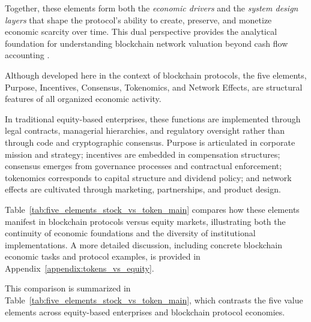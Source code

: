 \documentclass[12pt]{article}
\begin{document}
Together, these elements form both the \textit{economic drivers} and the \textit{system design layers} that shape the protocol’s ability to create, preserve, and monetize economic scarcity over time. This dual perspective provides the analytical foundation for understanding blockchain network valuation beyond cash flow accounting \citep{papadogiannis2025scarcity, papadogiannis2025dualrisk}.

\begin{tcolorbox}[title=\textbf{Universality of the Five Elements}]
Although developed here in the context of blockchain protocols, the five elements, Purpose, Incentives, Consensus, Tokenomics, and Network Effects, are structural features of all organized economic activity. 

In traditional equity-based enterprises, these functions are implemented through legal contracts, managerial hierarchies, and regulatory oversight rather than through code and cryptographic consensus. Purpose is articulated in corporate mission and strategy; incentives are embedded in compensation structures; consensus emerges from governance processes and contractual enforcement; tokenomics corresponds to capital structure and dividend policy; and network effects are cultivated through marketing, partnerships, and product design.

Table~\ref{tab:five_elements_stock_vs_token_main} compares how these elements manifest in blockchain protocols versus equity markets, illustrating both the continuity of economic foundations and the diversity of institutional implementations. A more detailed discussion, including concrete blockchain economic tasks and protocol examples, is provided in Appendix~\ref{appendix:tokens_vs_equity}.
\end{tcolorbox}

This comparison is summarized in Table~\ref{tab:five_elements_stock_vs_token_main}, 
which contrasts the five value elements across equity-based enterprises and 
blockchain protocol economies.
\end{document}
